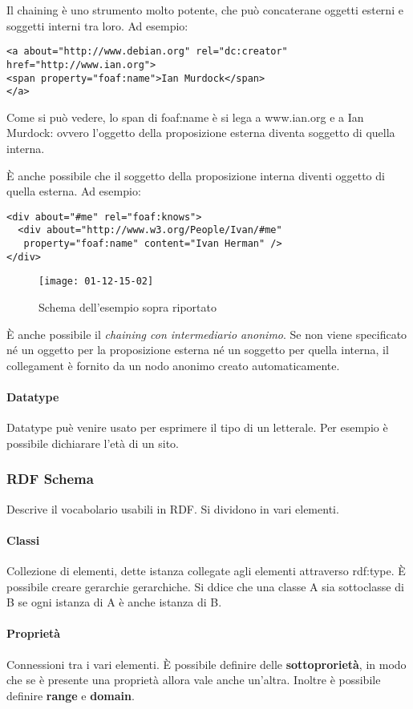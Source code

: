 Il chaining \`e uno strumento molto potente, che pu\`o concaterane oggetti esterni e soggetti interni tra loro. Ad esempio:
\begin{verbatim}
<a about="http://www.debian.org" rel="dc:creator"
href="http://www.ian.org">
<span property="foaf:name">Ian Murdock</span>
</a>
\end{verbatim}

Come si pu\`o vedere, lo span di foaf:name \`e si lega a www.ian.org e a Ian Murdock: ovvero l'oggetto della proposizione esterna diventa soggetto di quella interna.

\`E anche possibile che il soggetto della proposizione interna diventi oggetto di quella esterna. Ad esempio:
\begin{verbatim}
<div about="#me" rel="foaf:knows">
  <div about="http://www.w3.org/People/Ivan/#me"
   property="foaf:name" content="Ivan Herman" />
</div>
\end{verbatim}

\begin{figure}[h]
  \centering
  \texttt{[image: 01-12-15-02]}
  \caption{Schema dell'esempio sopra riportato}
\end{figure}

\`E anche possibile il \textit{chaining con intermediario anonimo}. Se non viene specificato n\'e un oggetto per la proposizione esterna n\'e un soggetto per quella interna, il collegament \`e fornito da un nodo anonimo creato automaticamente.

\paragraph*{Datatype}Datatype pu\`e venire usato per esprimere il tipo di un letterale.
Per esempio \`e possibile dichiarare l'et\`a di un sito.

\subsubsection{RDF Schema}
Descrive il vocabolario usabili in RDF. Si dividono in vari elementi.

\paragraph*{Classi}Collezione di elementi, dette istanza collegate agli elementi attraverso rdf:type. \`E possibile creare gerarchie gerarchiche. Si ddice che una classe A sia sottoclasse di B se ogni istanza di A \`e anche istanza di B.

\paragraph*{Propriet\`a}Connessioni tra i vari elementi. \`E possibile definire delle \textbf{sottoproriet\`a}, in modo che se \`e presente una propriet\`a allora vale anche un'altra. Inoltre \`e possibile definire \textbf{range} e \textbf{domain}.
